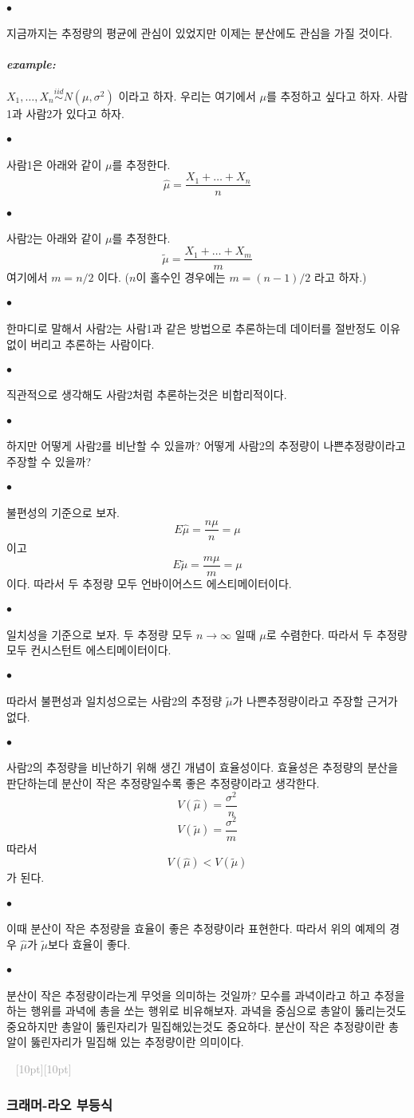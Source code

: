 \documentclass[12pt,oneside,english]{book}
\newcommand{\dash}{\vspace{2em}\noindent \textcolor{darkgray}{\hrulefill~ \raisebox{-2.5pt}[10pt][10pt]{\leafright \decofourleft \decothreeleft  \aldineright \decotwo \floweroneleft \decoone   \floweroneright \decotwo \aldineleft\decothreeright \decofourright \leafleft} ~  \hrulefill \\ \vspace{2em}}}
\def\ck{\paragraph{\Large$\bullet$}\Large}
\def\ex{\paragraph{\Large\textit{example:}}\Large}
\begin{document}
\ck 지금까지는 추정량의 평균에 관심이 있었지만 이제는 분산에도 관심을 가질 것이다. 

\ex $X_1,\dots, X_n \overset{iid}{\sim} N(\mu,\sigma^2)$ 이라고 하자. 우리는 여기에서 $\mu$를 추정하고 싶다고 하자. 사람1과 사람2가 있다고 하자. 

\ck 사람1은 아래와 같이 $\mu$를 추정한다. 
\[
\hat\mu=\frac{X_1+\dots+X_n}{n}
\]

\ck 사람2는 아래와 같이 $\mu$를 추정한다. 
\[
\tilde\mu=\frac{X_1+\dots+X_m}{m}
\]
여기에서 $m=n/2$ 이다. ($n$이 홀수인 경우에는 $m=(n-1)/2$ 라고 하자.) 

\ck 한마디로 말해서 사람2는 사람1과 같은 방법으로 추론하는데 데이터를 절반정도 이유없이 버리고 추론하는 사람이다. 

\ck 직관적으로 생각해도 사람2처럼 추론하는것은 비합리적이다. 

\ck 하지만 어떻게 사람2를 비난할 수 있을까? 어떻게 사람2의 추정량이 나쁜추정량이라고 주장할 수 있을까?

\ck 불편성의 기준으로 보자. 
\[
E\hat\mu=\frac{n\mu}{n}=\mu
\]
이고 
\[
E\tilde\mu=\frac{m\mu}{m}=\mu
\]
이다. 따라서 두 추정량 모두 언바이어스드 에스티메이터이다. 

\ck 일치성을 기준으로 보자. 두 추정량 모두 $n\to \infty$ 일때 $\mu$로 수렴한다. 따라서 두 추정량 모두 컨시스턴트 에스티메이터이다. 

\ck 따라서 불편성과 일치성으로는 사람2의 추정량 $\tilde\mu$가 나쁜추정량이라고 주장할 근거가 없다. 

\ck 사람2의 추정량을 비난하기 위해 생긴 개념이 효율성이다. 효율성은 추정량의 분산을 판단하는데 분산이 작은 추정량일수록 좋은 추정량이라고 생각한다. 
\[
V(\hat\mu)=\frac{\sigma^2}{n}
\]
\[
V(\tilde \mu)=\frac{\sigma^2}{m}
\]
따라서 
\[
V(\hat\mu) < V(\tilde\mu)
\]
가 된다. 

\ck 이때 분산이 작은 추정량을 효율이 좋은 추정량이라 표현한다. 따라서 위의 예제의 경우 $\hat\mu$가 $\tilde\mu$보다 효율이 좋다. 


\ck 분산이 작은 추정량이라는게 무엇을 의미하는 것일까? 모수를 과녁이라고 하고 추정을 하는 행위를 과녁에 총을 쏘는 행위로 비유해보자. 과녁을 중심으로 총알이 뚫리는것도 중요하지만 총알이 뚫린자리가 밀집해있는것도 중요하다. 분산이 작은 추정량이란 총알이 뚫린자리가 밀집해 있는 추정량이란 의미이다. 

\dash 

\subsubsection{크래머-라오 부등식}
\end{document}

